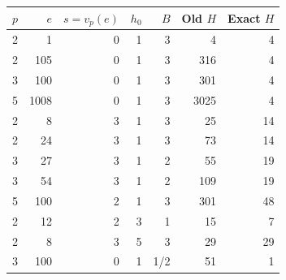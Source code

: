 \begin{tabular}{rrrrrrr}
\toprule
$p$ & $e$ & $s=v_p(e)$ & $h_0$ & $B$ & Old $H$ & Exact $H$\\
\midrule
2 & 1 & 0 & 1 & 3 & 4 & 4\\
2 & 105 & 0 & 1 & 3 & 316 & 4\\
3 & 100 & 0 & 1 & 3 & 301 & 4\\
5 & 1008 & 0 & 1 & 3 & 3025 & 4\\
2 & 8 & 3 & 1 & 3 & 25 & 14\\
2 & 24 & 3 & 1 & 3 & 73 & 14\\
3 & 27 & 3 & 1 & 2 & 55 & 19\\
3 & 54 & 3 & 1 & 2 & 109 & 19\\
5 & 100 & 2 & 1 & 3 & 301 & 48\\
2 & 12 & 2 & 3 & 1 & 15 & 7\\
2 & 8 & 3 & 5 & 3 & 29 & 29\\
3 & 100 & 0 & 1 & 1/2 & 51 & 1\\
\bottomrule
\end{tabular}
